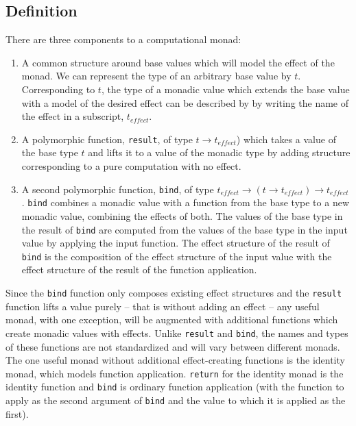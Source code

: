 \documentclass[natbib,10pt]{sigplanconf}
\begin{document}
\subsection{Definition}

There are three components to a computational monad:
\begin{enumerate}
\item
A common structure around base values which will model the
effect of the monad.  We can represent the type of an arbitrary 
base value by $t$. Corresponding to $t$, the type of a monadic 
value which extends the base value with a model of the desired 
effect can be described by by writing the name of the effect 
in a subscript, $t_{effect}$.

\item
A polymorphic function, {\tt result}, of type $t \rightarrow t_{effect}$) 
which takes a value of the base type $t$ and lifts it to a value of the
monadic type by adding structure corresponding to a pure computation
with no effect.

\item
A second polymorphic function, {\tt bind}, of type 
$t_{effect} \rightarrow (t \rightarrow t_{effect}) \rightarrow t_{effect}$. 
{\tt bind} combines a monadic value with a function from the base type to 
a new monadic value, combining the effects of both.  The values of the base 
type in the result of {\tt bind} are computed from the values of the base type 
in the input value by applying the input function.  The effect structure 
of the result of {\tt bind} is the composition of the effect structure 
of the input value with the effect structure of the result of the function
application.
\end{enumerate}

Since the {\tt bind} function only composes existing effect structures
and the {\tt result} function lifts a value purely -- that is without
adding an effect -- any useful monad, with one exception, will be augmented
with additional functions which create monadic values with effects.
Unlike {\tt result} and {\tt bind}, the names and types of these
functions are not standardized and will vary between different monads. 
The one useful monad without additional effect-creating functions is the 
identity monad, which models function application. {\tt return} for the 
identity monad is the identity function and {\tt bind} is ordinary 
function application (with the function to apply as the second argument
of {\tt bind} and the value to which it is applied as the first). 
\end{document}
